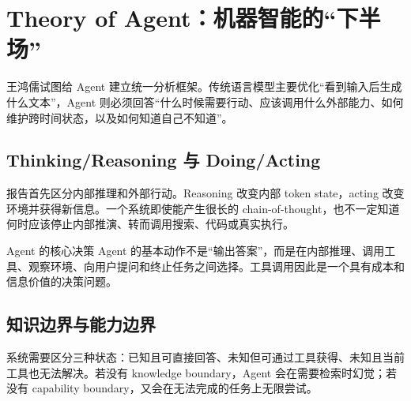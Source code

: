 \section{Theory of Agent：机器智能的“下半场”}

王鸿儒试图给 Agent 建立统一分析框架。传统语言模型主要优化“看到输入后生成什么文本”，Agent 则必须回答“什么时候需要行动、应该调用什么外部能力、如何维护跨时间状态，以及如何知道自己不知道”。


\subsection{Thinking/Reasoning 与 Doing/Acting}

报告首先区分内部推理和外部行动。Reasoning 改变内部 token state，acting 改变环境并获得新信息。一个系统即使能产生很长的 chain-of-thought，也不一定知道何时应该停止内部推演、转而调用搜索、代码或真实执行。



\begin{importantbox}{Agent 的核心决策}
Agent 的基本动作不是“输出答案”，而是在内部推理、调用工具、观察环境、向用户提问和终止任务之间选择。工具调用因此是一个具有成本和信息价值的决策问题。
\end{importantbox}

\subsection{知识边界与能力边界}

系统需要区分三种状态：已知且可直接回答、未知但可通过工具获得、未知且当前工具也无法解决。若没有 knowledge boundary，Agent 会在需要检索时幻觉；若没有 capability boundary，又会在无法完成的任务上无限尝试。



